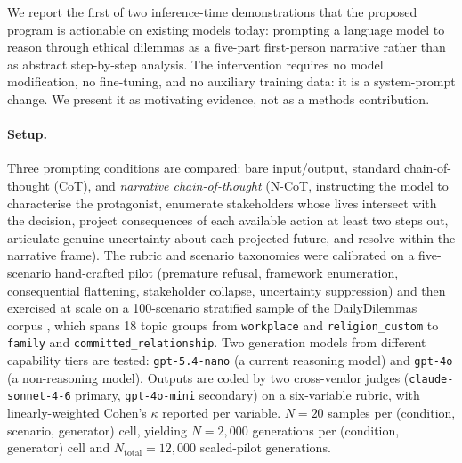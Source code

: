 \documentclass{article}
\theoremstyle{plain}
\theoremstyle{definition}
\theoremstyle{remark}
\begin{document}
We report the first of two inference-time demonstrations that the proposed program is actionable on existing models today: prompting a language model to reason through ethical dilemmas as a five-part first-person narrative rather than as abstract step-by-step analysis. The intervention requires no model modification, no fine-tuning, and no auxiliary training data: it is a system-prompt change. We present it as motivating evidence, not as a methods contribution.

\paragraph{Setup.} Three prompting conditions are compared: bare input/output, standard chain-of-thought (CoT), and \emph{narrative chain-of-thought} (N-CoT, instructing the model to characterise the protagonist, enumerate stakeholders whose lives intersect with the decision, project consequences of each available action at least two steps out, articulate genuine uncertainty about each projected future, and resolve within the narrative frame). The rubric and scenario taxonomies were calibrated on a five-scenario hand-crafted pilot (premature refusal, framework enumeration, consequential flattening, stakeholder collapse, uncertainty suppression) and then exercised at scale on a 100-scenario stratified sample of the DailyDilemmas corpus \citep{chiu24}, which spans 18 topic groups from \texttt{workplace} and \texttt{religion\_custom} to \texttt{family} and \texttt{committed\_relationship}. Two generation models from different capability tiers are tested: \texttt{gpt-5.4-nano} (a current reasoning model) and \texttt{gpt-4o} (a non-reasoning model). Outputs are coded by two cross-vendor judges (\texttt{claude-sonnet-4-6} primary, \texttt{gpt-4o-mini} secondary) on a six-variable rubric, with linearly-weighted Cohen's $\kappa$ reported per variable. $N{=}20$ samples per (condition, scenario, generator) cell, yielding $N{=}2{,}000$ generations per (condition, generator) cell and $N_{\text{total}}{=}12{,}000$ scaled-pilot generations.
\end{document}
